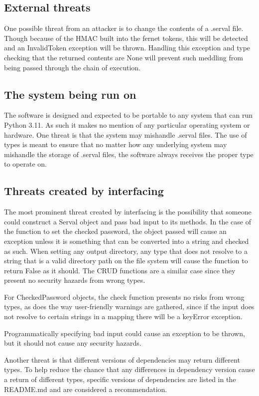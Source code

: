 \documentclass[12pt, letterpaper]{article}
\begin{document}
\subsection{External threats}

One possible threat from an attacker is to change the contents of a .serval file. Though because of the HMAC built into the fernet tokens, this will be detected and an InvalidToken exception will be thrown. Handling this exception and type checking that the returned contents are None will prevent such meddling from being passed through the chain of execution.

\subsection{The system being run on}

The software is designed and expected to be portable to any system that can run Python 3.11. As such it makes no mention of any particular operating system or hardware. One threat is that the system may mishandle .serval files. The use of types is meant to ensure that no matter how any underlying system may mishandle the storage of .serval files, the software always receives the proper type to operate on. 

\subsection{Threats created by interfacing}

The most prominent threat created by interfacing is the possibility that someone could construct a Serval object and pass bad input to its methods. In the case of the function to set the checked password, the object passed will cause an exception unless it is something that can be converted into a string and checked as such. When setting any output directory, any type that does not resolve to a string that is a valid directory path on the file system will cause the function to return False as it should. The CRUD functions are a similar case since they present no security hazards from wrong types.

For CheckedPassword objects, the check function presents no risks from wrong types, as does the way user-friendly warnings are gathered, since if the input does not resolve to certain strings in a mapping there will be a keyError exception.

Programmatically specifying bad input could cause an exception to be thrown, but it should not cause any security hazards.

Another threat is that different versions of dependencies may return different types. To help reduce the chance that any differences in dependency version cause a return of different types, specific versions of dependencies are listed in the README.md and are considered a recommendation.
\end{document}
